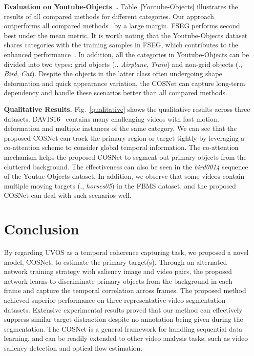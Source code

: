 \documentclass[10pt,twocolumn,letterpaper]{article}
\begin{document}
\noindent\textbf{Evaluation on Youtube-Objects~\cite{DBLP:conf/cvpr/PrestLCSF12}.} Table~\ref{Youtube-Objects} illustrates the results of all compared methods for different categories. Our approach outperforms all compared methods~\cite{DBLP:conf/iccv/PapazoglouF13,tsai2016semantic,DBLP:conf/cvpr/KohK17,DBLP:conf/iccv/TokmakovAS17,Song_2018_ECCV,jain2017fusionseg,cheng2017segflow} by a large margin.  FSEG performs second best under the mean  metric. It is worth noting that the Youtube-Objects dataset shares categories with the training samples in FSEG, which contributes to the enhanced performance~\cite{jain2017fusionseg}. In addition, all the categories in Youtube-Objects can be divided into two types: grid objects (\eg., \textit{Airplane}, \textit{Train}) and non-grid objects (\eg., \textit{Bird}, \textit{Cat}). Despite the objects in the latter class often undergoing shape deformation and quick appearance variation,  the COSNet can capture long-term dependency and handle these scenarios  better than all compared methods. 

\noindent\textbf{Qualitative Results.}
Fig.~\ref{qualitative} shows the qualitative results across three
datasets.  DAVIS16~\cite{perazzi2016benchmark} contains many challenging videos with fast motion, deformation and multiple instances of the same category. We can see that the proposed COSNet can track the primary region or target tightly by leveraging a co-attention scheme to consider global temporal information. The co-attention mechanism helps the proposed COSNet to segment out primary objects from the cluttered background. The effectiveness can also be seen in the \textit{bird0014} sequence of the Youtue-Objects dataset.
In addition, we observe that some videos contain multiple moving targets (\eg., \textit{horses05}) in the FBMS dataset, and the proposed COSNet can deal with such scenarios well.
\vspace*{-10pt}
\section{Conclusion}
\vspace*{-2pt}
By regarding UVOS as a temporal coherence capturing task, we proposed a novel model, COSNet, to estimate the primary target(s).  Through an alternated network training strategy with saliency image and video pairs, the proposed network learns to discriminate primary objects from the background in each frame and capture the temporal correlation across frames. The proposed method achieved superior performance on three representative video segmentation datasets.  Extensive experimental results proved that our method can effectively suppress similar target distraction despite no annotation being given during the segmentation. The COSNet is a general framework for handling sequential data learning, and can be readily extended to other video analysis tasks, such as video saliency detection and optical flow estimation.
\end{document}
